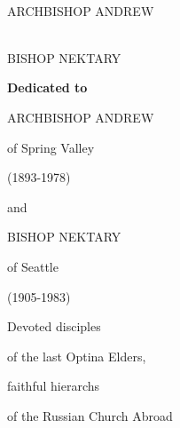 \begin{center}
	\setlength\fboxrule{2pt}
	\color{red}\\
	\color{black}ARCHBISHOP ANDREW

	\vspace{1cm}
	\color{red}\\
	\color{black}BISHOP NEKTARY
\end{center}
\newpage
\vspace*{\fill}
\begin{center}
	\minicross
	\textbf{Dedicated to}
	
	\vspace{.5cm}
	\color{red}ARCHBISHOP ANDREW
	
	\color{black} of Spring Valley
	
	(1893-1978)
	
	\vspace{.5cm}
	and
	
	\vspace{.5cm}
	\color{red}BISHOP NEKTARY
	
	\color{black}of Seattle
	
	(1905-1983)
	
	\vspace{1cm}
	Devoted disciples
	
	of the last Optina Elders,
	
	faithful hierarchs
	
	of the Russian Church Abroad
	
	\minicross
\end{center}
\vspace*{\fill}
\newpage